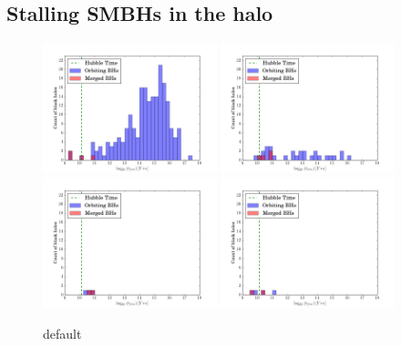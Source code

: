\documentclass[english, apj]{emulateapj}
\begin{document}
\subsection{Stalling SMBHs in the halo}
\begin{figure}[htbp]
\begin{center}
\includegraphics[width=0.45\textwidth]{plots/t_at_center_histogram_gal_1.png}
\includegraphics[width=0.45\textwidth]{plots/t_at_center_histogram_gal_65.png}\\
\includegraphics[width=0.45\textwidth]{plots/t_at_center_histogram_gal_187.png}
\includegraphics[width=0.45\textwidth]{plots/t_at_center_histogram_gal_217.png}\\
\caption{default}
\label{default}
\end{center}
\end{figure}
\end{document}
